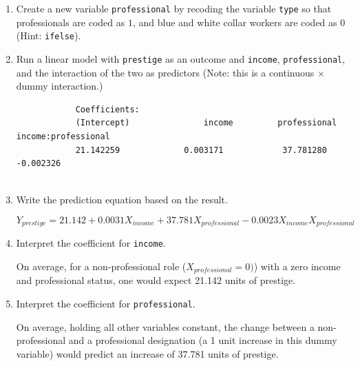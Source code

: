 \documentclass[12pt,letterpaper]{article}
\begin{document}
\newpage
\begin{enumerate}
	
	\item [(a)]
	Create a new variable \texttt{professional} by recoding the variable \texttt{type} so that professionals are coded as $1$, and blue and white collar workers are coded as $0$ (Hint: \texttt{ifelse}).
	
	\vspace{.5cm}
			  
	

	
	\item [(b)]
	Run a linear model with \texttt{prestige} as an outcome and \texttt{income}, \texttt{professional}, and the interaction of the two as predictors (Note: this is a continuous $\times$ dummy interaction.)
	
	\vspace{.5cm}
		  
		\begin{footnotesize}
		
		\begin{verbatim}
			Coefficients:
			(Intercept)               income         professional  income:professional  
			21.142259             0.003171            37.781280            -0.002326  
			
		\end{verbatim}
	\end{footnotesize}
	
	\item [(c)]
	Write the prediction equation based on the result.
	
	$$
	Y_{prestige} = 21.142  + 0.0031X_{income} + 37.781X_{professional} - 0.0023X_{income}X_{professional}	
	$$
	

	\item [(d)]
	Interpret the coefficient for \texttt{income}.
	
	On average, for a non-professional role ($X_{professional} =0 )$) with a zero income and professional status, one would expect 21.142 units of prestige.
	
	\vspace{.5cm}	
	\item [(e)]
	Interpret the coefficient for \texttt{professional}.
	
	On average, holding all other variables constant, the change between a non-professional and a professional designation (a 1 unit increase in this dummy variable)  would predict an increase of  37.781 units of prestige. 
	

\end{enumerate}
\end{document}
